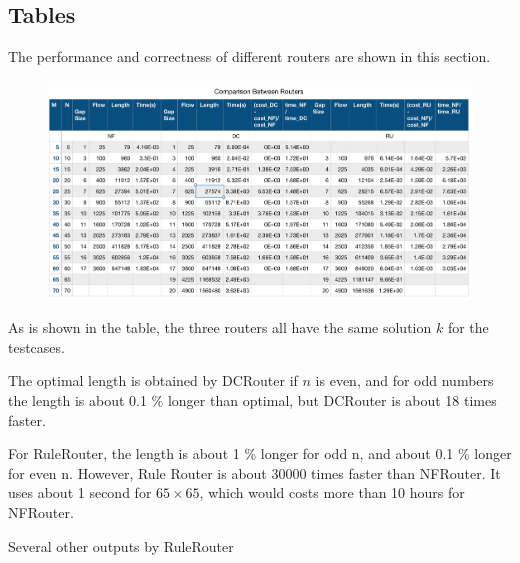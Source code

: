 \documentclass{article}
\begin{document}
\begin{spacing}{1.1}
    \subsection{Tables}
    \label{STAT}
    The performance and correctness of different routers are shown in this section.
    \begin{figure}[H]
        \includegraphics[width = \textwidth]{TABL1.png}
    \end{figure}
    As is shown in the table, the three routers all have the same solution $k$ for the testcases.

    The optimal length is obtained by DCRouter if $n$ is even, and for odd numbers the length is about 0.1 \% longer than optimal, but DCRouter is about 18 times faster.

    For RuleRouter, the length is about 1 \% longer for odd n, and about 0.1 \% longer for even n. However, Rule Router is about 30000 times faster than NFRouter. It uses about 1 second for $65 \times 65 $, which would costs more than 10 hours for NFRouter.
    \begin{table}[H]
        \centering
        \caption{Several other outputs by RuleRouter}
    \end{table}

\end{spacing}
\end{document}
